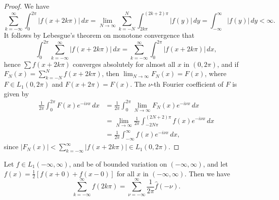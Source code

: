 \begin{proof}
We have
\begin{equation*}
\sum_{k=-\infty}^{\infty}\int_0^{2\pi}|f(x+2k\pi)|\,dx
=\lim_{N\to\infty}\sum_{k=-N}^{N}\int_{2k\pi}^{(2k+2)\pi}|f(y)|\,dy
=\int_{-\infty}^{\infty}|f(y)|\,dy<\infty.
\end{equation*}
It follows by Lebesgue's theorem on monotone convergence that
\begin{equation*}
\int_0^{2\pi}\sum_{k=-\infty}^{\infty}|f(x+2k\pi)|\,dx
=\sum_{k=-\infty}^{\infty}\int_0^{2\pi}|f(x+2k\pi)|\,dx,
\end{equation*}
hence $\sum f(x+2k\pi)$ converges absolutely for almost all $x$ in $(0,2\pi)$, and if $F_N(x)=\sum_{k=-N}^{N}f(x+2k\pi)$, then $\lim_{N\to\infty}F_N(x)=F(x)$, where $F\in L_1(0,2\pi)$ and $F(x+2\pi)=F(x)$. The $\nu$-th Fourier coefficient of $F$ is given by
\begin{align*}
\frac{1}{2\pi}\int_0^{2\pi}F(x)e^{-i\nu x}\,dx
&=\frac{1}{2\pi}\int_0^{2\pi}\lim_{N\to\infty}F_N(x)e^{-i\nu x}\,dx\\
&=\lim_{N\to\infty}\frac{1}{2\pi}\int_{-2N\pi}^{(2N+2)\pi}f(x)e^{-i\nu x}\,dx\\
&=\frac{1}{2\pi}\int_{-\infty}^{\infty}f(x)e^{-i\nu x}\,dx,
\end{align*}
since $|F_N(x)|<\sum_{k=-\infty}^{\infty}|f(x+2k\pi)|\in L_1(0,2\pi)$.
\end{proof}

\begin{theorem}\label{thm:I-6}
Let $f\in L_1(-\infty,\infty)$, and be of bounded variation on $(-\infty,\infty)$, and let $f(x)=\frac12[f(x+0)+f(x-0)]$ for all $x$ in $(-\infty,\infty)$. Then we have
\begin{equation}\label{eq:I-5.5}
\sum_{k=-\infty}^{\infty}f(2k\pi)
=\sum_{\nu=-\infty}^{\infty}\frac{1}{2\pi}\hat f(-\nu).
\end{equation}
\end{theorem}

